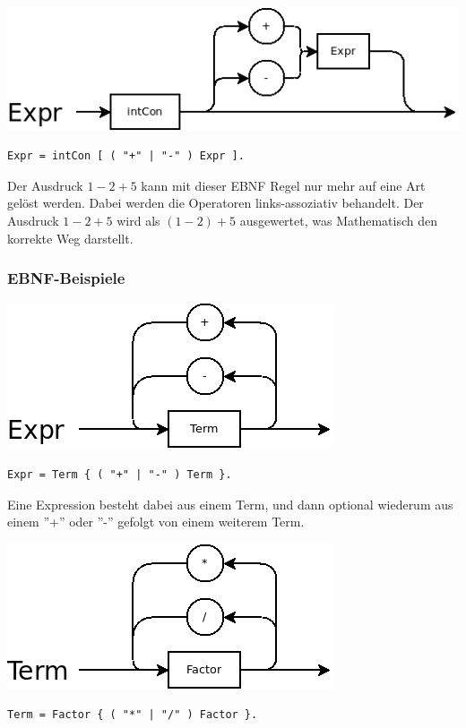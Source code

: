 \includegraphics[scale=0.5]{./media/images/compiler/ambiguity_correct.png}

\begin{lstlisting}[language=EBNF]
Expr = intCon [ ( "+" | "-" ) Expr ].
\end{lstlisting}

Der Ausdruck $1-2+5$ kann mit dieser EBNF Regel nur mehr auf eine Art gelöst werden. Dabei werden die Operatoren links-assoziativ behandelt. Der Ausdruck $1-2+5$ wird als $(1-2)+5$ ausgewertet, was Mathematisch den korrekte Weg darstellt.

\subsubsection{EBNF-Beispiele}

\includegraphics[scale=0.5]{./media/images/compiler/ebnf_expr.png}

\begin{lstlisting}[language=EBNF]
Expr = Term { ( "+" | "-" ) Term }.
\end{lstlisting}

Eine Expression besteht dabei aus einem Term, und dann optional wiederum aus einem ''+'' oder ''-'' gefolgt von einem weiterem Term.

\includegraphics[scale=0.5]{./media/images/compiler/ebnf_term.png}
\begin{lstlisting}[language=EBNF]
Term = Factor { ( "*" | "/" ) Factor }.
\end{lstlisting}

